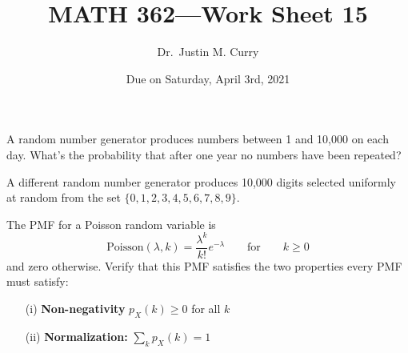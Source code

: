 \documentclass[addpoints,12pt]{exam}
\title{\vspace{-1in} MATH 362---Work Sheet 15}
\date{Due on Saturday, April 3rd, 2021}
\author{Dr.~Justin M. Curry}
\begin{document}
\maketitle






\begin{questions}

\question[1] A random number generator produces numbers between 1 and 10,000 on each day. What's the probability that after one year no numbers have been repeated?

\vspace{1.2in}

\question[3] 
A different random number generator produces 10,000 digits selected uniformly at random from the set $\{0,1,2,3,4,5,6,7,8,9\}$.
\noaddpoints
{}

\newpage

\question[2] The PMF for a Poisson random variable is $$\text{Poisson}(\lambda,k) = \frac{\lambda^k}{k!} e^{-\lambda} \qquad \text{for} \qquad k\geq 0$$ and zero otherwise.
Verify that this PMF satisfies the two properties every PMF must satisfy:
\begin{enumerate}
	\item[(i)] {\bf Non-negativity} $p_X(k)\geq 0$ for all $k$
	\item[(ii)] {\bf Normalization:} $\sum_k p_X(k) =1$
\end{enumerate}
\vspace{1.5in}


\end{questions}
\end{document}
